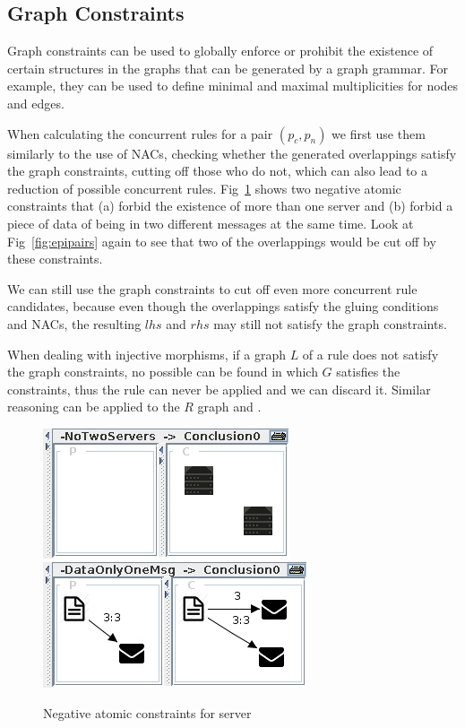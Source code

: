 \subsection{Graph Constraints}\label{sec:constraints}

Graph constraints can be used to globally enforce or prohibit the existence of certain structures in the graphs that can be generated by a graph grammar. For example, they can be used to define minimal and maximal multiplicities for nodes and edges.

When calculating the concurrent rules for a pair $(p_c, p_n)$ we first use them similarly to the use of NACs, checking whether the generated overlappings satisfy the graph constraints, cutting off those who do not, which can also lead to a reduction of possible concurrent rules. Fig~\ref{fig:constraints} shows two negative atomic constraints that (a) forbid the existence of more than one server and (b) forbid a piece of data of being in two different messages at the same time. Look at
Fig~\ref{fig:epipairs} again to see that two of the overlappings would be cut off by these constraints.

We can still use the graph constraints to cut off even more concurrent rule candidates, because even though the overlappings satisfy the gluing conditions and NACs, the resulting $lhs$ and $rhs$ may still not satisfy the graph constraints. 

When dealing with injective morphisms, if a graph $L$ of a rule does not satisfy the graph constraints, no possible \match{} can be found in which $G$ satisfies the constraints, thus the rule can never be applied and we can discard it. Similar reasoning can be applied to the $R$ graph and \comatch{}.

\begin{figure}
\centering
\includegraphics{grammar/no_two_servers}
\includegraphics{grammar/data_no_two_msgs}
\caption{\label{fig:constraints} Negative atomic constraints for server}
\end{figure}

